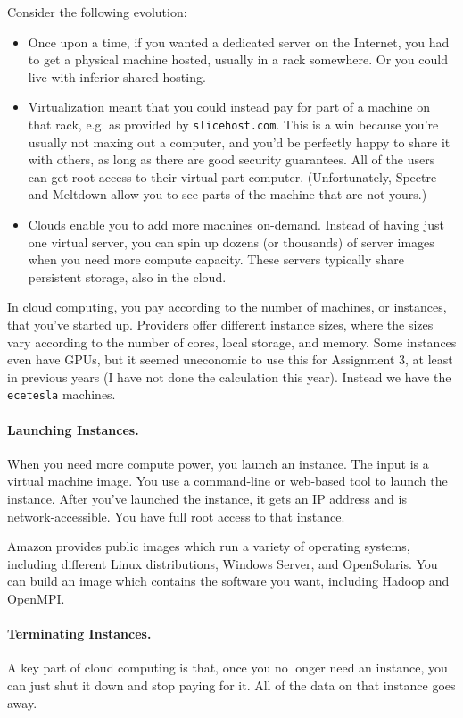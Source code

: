 \documentclass[a4paper]{report}
\begin{document}
Consider the following evolution:
\begin{itemize}
\item Once upon a time, if you wanted a dedicated server on the
  Internet, you had to get a physical machine hosted, usually in a
  rack somewhere. Or you could live with inferior shared hosting.
\item Virtualization meant that you could instead pay for part of a
  machine on that rack, e.g. as provided by {\tt slicehost.com}.  This
  is a win because you're usually not maxing out a computer, and you'd
  be perfectly happy to share it with others, as long as there are
  good security guarantees. All of the users can get root access to their virtual part computer.
  (Unfortunately, Spectre and Meltdown allow you to see parts of the machine that are not yours.)
\item Clouds enable you to add more machines on-demand. Instead of
  having just one virtual server, you can spin up dozens (or
  thousands) of server images when you need more compute
  capacity. These servers typically share persistent storage, also in
  the cloud. 
\end{itemize}

In cloud computing, you pay according to the number of machines, or
instances, that you've started up. Providers offer different instance
sizes, where the sizes vary according to the number of cores, local
storage, and memory. Some instances even have GPUs, but it seemed 
uneconomic to use this for Assignment 3, at least in previous years (I
have not done the calculation this year). 
Instead we have the {\tt ecetesla} machines.

\paragraph{Launching Instances.} When you need more compute power,
you launch an instance. The input is a virtual machine image.  You use
a command-line or web-based tool to launch the instance.  After you've
launched the instance, it gets an IP address and is
network-accessible. You have full root access to that instance.

Amazon provides public images which run a variety of operating
systems, including different Linux distributions, Windows Server, and
OpenSolaris. You can build an image which contains the software you
want, including Hadoop and OpenMPI.

\paragraph{Terminating Instances.} A key part of cloud computing is
that, once you no longer need an instance, you can just shut it down
and stop paying for it. All of the data on that instance goes away.
\end{document}
